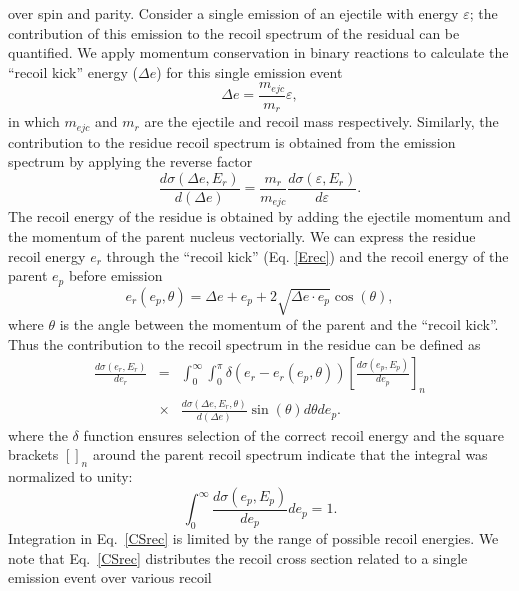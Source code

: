 \documentclass[twocolumn,amsmath,amssymb,10pt,groupedaddress,letter]{revtex4}
\begin{document}
over spin and parity. Consider a single emission of an ejectile with
energy $\varepsilon$; the contribution of this emission to the recoil
spectrum of the residual can be quantified. We apply momentum conservation
in binary reactions to calculate the {}``recoil kick'' energy ($\Delta e$)
for this single emission event
 \begin{equation}
\Delta e=\frac{m_{ejc}}{m_{r}}\varepsilon,
\label{Erec}
\end{equation}
in which $m_{ejc}$ and $m_{r}$ are the ejectile and recoil mass
respectively. Similarly, the contribution to the residue recoil spectrum
is obtained from the emission spectrum by applying the reverse factor
\begin{equation}
\frac{d\sigma(\Delta e,E_{r})}{d(\Delta e)}=\frac{m_{r}}{m_{ejc}}\frac{d\sigma(\varepsilon,E_{r})}{d\varepsilon}.
\label{CSkick}
\end{equation}
The recoil energy of the residue is obtained by adding the ejectile
momentum and the momentum of the parent nucleus vectorially. We can
express the residue recoil energy $e_{r}$ through the {}``recoil
kick'' (Eq. \ref{Erec}) and the recoil energy of the parent $e_{p}$
before emission
\begin{equation}
e_{r}(e_{p},\theta)=\Delta e+e_{p}+2\sqrt{\Delta e\cdot e_{p}}\cos(\theta),
\label{Eresrec}
\end{equation}
\noindent where $\theta$ is the angle between the momentum of the parent and
the {}``recoil kick''. Thus the contribution to the recoil spectrum
in the residue can be defined as
\begin{eqnarray}
\frac{d\sigma(e_{r},E_{r})}{de_{r}}&=&\int_{0}^{\infty}\int_{0}^{\pi}\delta\left(e_{r}-e_{r}(e_{p},\theta)\right)\left[\frac{d\sigma(e_{p},E_{p})}{de_{p}}\right]_{n}\nonumber\\
&\times&\frac{d\sigma(\Delta e,E_{r},\theta)}{d(\Delta e)}\sin(\theta)d\theta de_{p}.
\label{CSrec}
\end{eqnarray}
\noindent where the $\delta$ function ensures selection of the correct recoil
energy and the square brackets $\left[\right]_{n}$ around the parent
recoil spectrum indicate that the integral was normalized to unity:
\begin{equation}
\int_{0}^{\infty}\frac{d\sigma(e_{p},E_{p})}{de_{p}}de_{p}=1.
\end{equation}
Integration in Eq.~\ref{CSrec} is limited by the range of possible
recoil energies. We note that Eq.~\ref{CSrec} distributes the recoil
cross section related to a single emission event over various recoil
\end{document}
